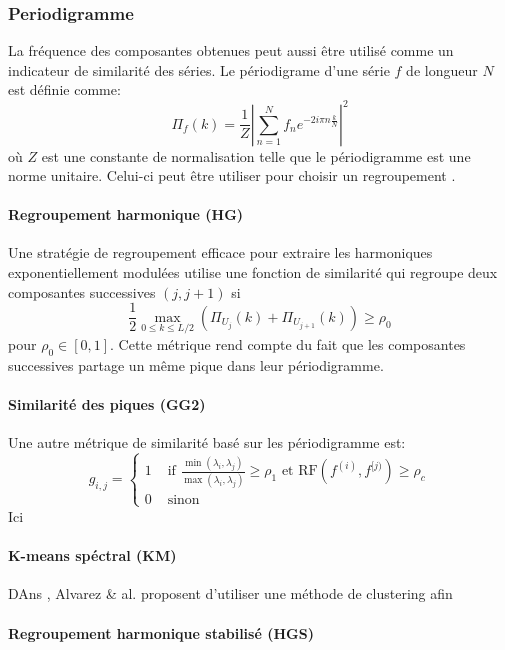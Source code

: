 \documentclass{gretsi}
\begin{document}
\subsubsection{Periodigramme}

La fréquence des composantes obtenues peut aussi être utilisé comme un indicateur de similarité des séries. Le périodigrame d'une série $f$ de longueur $N$ est définie comme:$$
\Pi_f(k) = \frac{1}{Z}\left|\sum_{n=1}^N f_n e^{-2i\pi n \frac{k}{N}}\right|^2
$$ où $Z$ est une constante de normalisation telle que le périodigramme est une norme unitaire. Celui-ci peut être utiliser pour choisir un regroupement \cite{GNZ_10_SSA}.

\paragraph{Regroupement harmonique (HG)}\label{par:HG}
    Une stratégie de regroupement efficace pour extraire les harmoniques exponentiellement modulées \cite{alexandrov_05_auto} utilise une fonction de similarité qui regroupe deux composantes successives $(j, j+1)$ si 
    $$
    \frac{1}{2}\max_{0\le k \le L/2}\left(\Pi_{U_j}(k) + \Pi_{U_{j+1}}(k)\right) \ge \rho_0 
    $$pour $\rho_0\in \left[0, 1\right]$. Cette métrique rend compte du fait que les composantes successives partage un même pique dans leur périodigramme.


\paragraph{Similarité des piques (GG2)}\label{par:GG2}
    Une autre métrique de similarité basé sur les périodigramme est:
    $$
    g_{i, j} = \begin{cases}
	    1 & \text{ if } \displaystyle\frac{\min(\lambda_i, \lambda_j)}{\max(\lambda_i, \lambda_j)} \ge \rho_1 \text{ et } \text{RF}(f^{(i)}, f^{[j)}) \ge \rho_c\\
	    0 & \text{ sinon}
    \end{cases}
    $$Ici
\paragraph{K-means spéctral (KM)}\label{par:KM}
DAns \cite{alvarez_2013_auto}, Alvarez \& al. proposent d'utiliser une méthode de clustering afin


\paragraph{Regroupement harmonique stabilisé (HGS)}\label{par:HGS}
\end{document}
